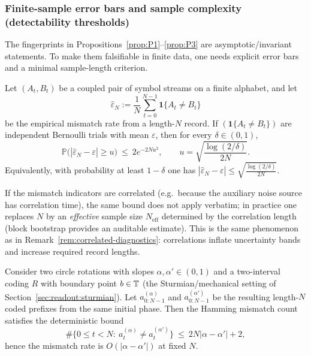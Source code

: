 \subsubsection{Finite-sample error bars and sample complexity (detectability thresholds)}\label{sec:falsifiability:sample-complexity}

The fingerprints in Propositions~\ref{prop:P1}--\ref{prop:P3} are asymptotic/invariant statements. To make them falsifiable in finite data, one needs explicit error bars and a minimal sample-length criterion.

\begin{proposition}\label{prop:mismatch-hoeffding}
Let $(A_t,B_t)$ be a coupled pair of symbol streams on a finite alphabet, and let
\[
\widehat\varepsilon_N:=\frac{1}{N}\sum_{t=0}^{N-1}\mathbf{1}\{A_t\neq B_t\}
\]
be the empirical mismatch rate from a length-$N$ record. If $(\mathbf{1}\{A_t\neq B_t\})$ are independent Bernoulli trials with mean $\varepsilon$, then for every $\delta\in(0,1)$,
\[
\mathbb{P}\bigl(|\widehat\varepsilon_N-\varepsilon|\ge u\bigr)\ \le\ 2e^{-2Nu^2},
\qquad
u=\sqrt{\frac{\log(2/\delta)}{2N}}.
\]
Equivalently, with probability at least $1-\delta$ one has $|\widehat\varepsilon_N-\varepsilon|\le \sqrt{\tfrac{\log(2/\delta)}{2N}}$.
\cite{Hoeffding1963}
\end{proposition}

\begin{remark}
If the mismatch indicators are correlated (e.g.\ because the auxiliary noise source has correlation time), the same bound does not apply verbatim; in practice one replaces $N$ by an \emph{effective} sample size $N_{\mathrm{eff}}$ determined by the correlation length (block bootstrap provides an auditable estimate). This is the same phenomenon as in Remark~\ref{rem:correlated-diagnostics}: correlations inflate uncertainty bands and increase required record lengths.
\end{remark}

\begin{proposition}\label{prop:slope-separation-hamming}
Consider two circle rotations with slopes $\alpha,\alpha'\in(0,1)$ and a two-interval coding $R$ with boundary point $b\in\mathbb{T}$ (the Sturmian/mechanical setting of Section~\ref{sec:readout:sturmian}). Let $a^{(\alpha)}_{0:N-1}$ and $a^{(\alpha')}_{0:N-1}$ be the resulting length-$N$ coded prefixes from the same initial phase. Then the Hamming mismatch count satisfies the deterministic bound
\[
\#\{0\le t<N:\ a^{(\alpha)}_t\neq a^{(\alpha')}_t\}\ \le\ 2N|\alpha-\alpha'|+2,
\]
hence the mismatch rate is $O(|\alpha-\alpha'|)$ at fixed $N$.
\end{proposition}

